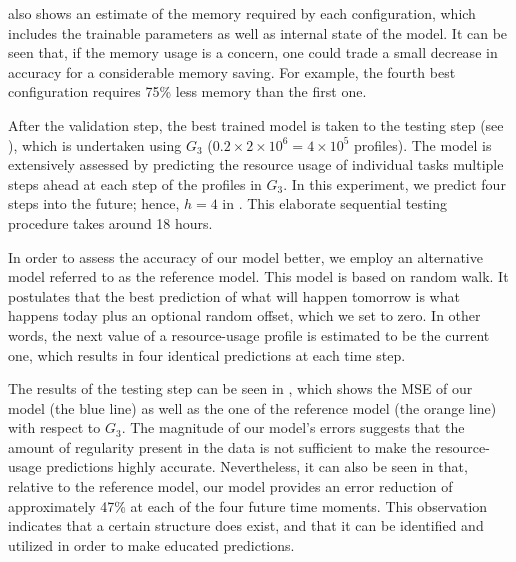  also shows an estimate of the memory required by each
configuration, which includes the trainable parameters as well as internal state
of the model. It can be seen that, if the memory usage is a concern, one could
trade a small decrease in accuracy for a considerable memory saving. For
example, the fourth best configuration requires 75\% less memory than the first
one.

After the validation step, the best trained model is taken to the testing step
(see ), which is undertaken using $G_3$ ($0.2 \times 2
\times 10^6 = 4 \times 10^5$ profiles). The model is extensively assessed by
predicting the resource usage of individual tasks multiple steps ahead at each
step of the profiles in $G_3$. In this experiment, we predict four steps into
the future; hence, $h = 4$ in . This elaborate sequential
testing procedure takes around 18 hours.

In order to assess the accuracy of our model better, we employ an alternative
model referred to as the reference model. This model is based on random walk. It
postulates that the best prediction of what will happen tomorrow is what happens
today plus an optional random offset, which we set to zero. In other words, the
next value of a resource-usage profile is estimated to be the current one, which
results in four identical predictions at each time step.

The results of the testing step can be seen in , which shows
the \ac{MSE} of our model (the blue line) as well as the one of the reference
model (the orange line) with respect to $G_3$. The magnitude of our model's
errors suggests that the amount of regularity present in the data is not
sufficient to make the resource-usage predictions highly accurate. Nevertheless,
it can also be seen in  that, relative to the reference
model, our model provides an error reduction of approximately 47\% at each of
the four future time moments. This observation indicates that a certain
structure does exist, and that it can be identified and utilized in order to
make educated predictions.
